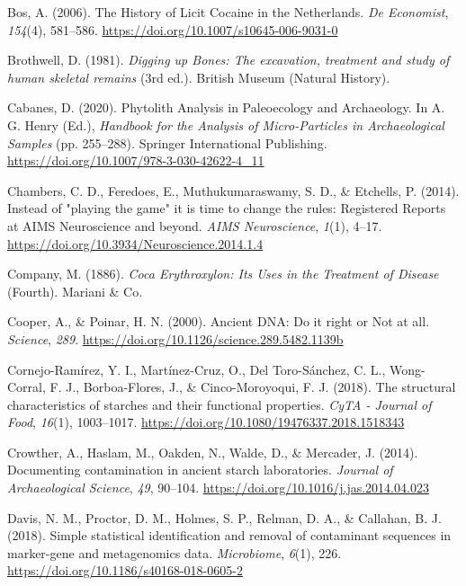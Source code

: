 \documentclass[
  b5paper,
]{book}
\newlength{\cslhangindent}
\newenvironment{CSLReferences}[2] %
 {\begin{list}{}{%
  \setlength{\itemindent}{0pt}
  \setlength{\leftmargin}{0pt}
  \setlength{\parsep}{0pt}
  \ifodd #1
   \setlength{\leftmargin}{\cslhangindent}
   \setlength{\itemindent}{-1\cslhangindent}
  \fi
  \setlength{\itemsep}{#2\baselineskip}}}
 {\end{list}}
\begin{document}
\begin{CSLReferences}{1}{0}
Bos, A. (2006). The {History} of {Licit Cocaine} in the {Netherlands}.
\emph{De Economist}, \emph{154}(4), 581--586.
\url{https://doi.org/10.1007/s10645-006-9031-0}

Brothwell, D. (1981). \emph{Digging up {Bones}: {The} excavation,
treatment and study of human skeletal remains} (3rd ed.). {British
Museum (Natural History)}.

Cabanes, D. (2020). Phytolith {Analysis} in {Paleoecology} and
{Archaeology}. In A. G. Henry (Ed.), \emph{Handbook for the {Analysis}
of {Micro-Particles} in {Archaeological Samples}} (pp. 255--288).
{Springer International Publishing}.
\url{https://doi.org/10.1007/978-3-030-42622-4_11}

Chambers, C. D., Feredoes, E., Muthukumaraswamy, S. D., \& Etchells, P.
(2014). Instead of "playing the game" it is time to change the rules:
{Registered Reports} at {AIMS Neuroscience} and beyond. \emph{AIMS
Neuroscience}, \emph{1}(1), 4--17.
\url{https://doi.org/10.3934/Neuroscience.2014.1.4}

Company, M. (1886). \emph{Coca {Erythroxylon}: {Its Uses} in the
{Treatment} of {Disease}} (Fourth). {Mariani \& Co.}

Cooper, A., \& Poinar, H. N. (2000). Ancient {DNA}: {Do} it right or
{Not} at all. \emph{Science}, \emph{289}.
\url{https://doi.org/10.1126/science.289.5482.1139b}

Cornejo-Ramírez, Y. I., Martínez-Cruz, O., Del Toro-Sánchez, C. L.,
Wong-Corral, F. J., Borboa-Flores, J., \& Cinco-Moroyoqui, F. J. (2018).
The structural characteristics of starches and their functional
properties. \emph{CyTA - Journal of Food}, \emph{16}(1), 1003--1017.
\url{https://doi.org/10.1080/19476337.2018.1518343}

Crowther, A., Haslam, M., Oakden, N., Walde, D., \& Mercader, J. (2014).
Documenting contamination in ancient starch laboratories. \emph{Journal
of Archaeological Science}, \emph{49}, 90--104.
\url{https://doi.org/10.1016/j.jas.2014.04.023}

Davis, N. M., Proctor, D. M., Holmes, S. P., Relman, D. A., \& Callahan,
B. J. (2018). Simple statistical identification and removal of
contaminant sequences in marker-gene and metagenomics data.
\emph{Microbiome}, \emph{6}(1), 226.
\url{https://doi.org/10.1186/s40168-018-0605-2}


\end{CSLReferences}
\end{document}
